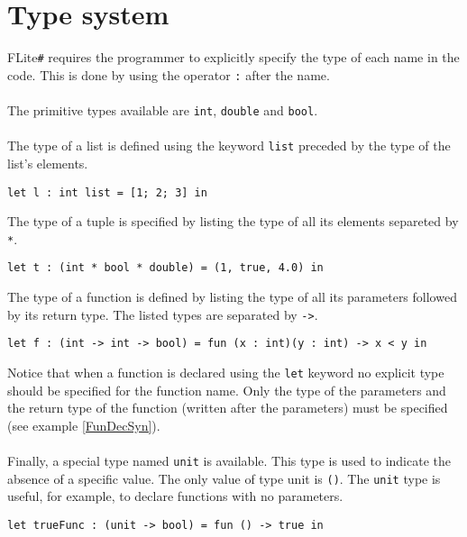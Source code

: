 \documentclass[]{article}
\begin{document}
	\section{Type system}
		FLite\verb|#| requires the programmer to explicitly specify the type of each name in the code. This is done by using the operator \lstinline|:| after the name.\\\\
		The primitive types available are \lstinline|int|, \lstinline|double| and \lstinline|bool|.\\\\
		The type of a list is defined using the keyword \lstinline|list| preceded by the type of the list's elements.
		\begin{lstlisting}[caption={List type}, label=ListType]
let l : int list = [1; 2; 3] in
		\end{lstlisting}
		The type of a tuple is specified by listing the type of all its elements separeted by \lstinline|*|.
		\begin{lstlisting}[caption={Tuple type}, label=TupleType]
let t : (int * bool * double) = (1, true, 4.0) in
		\end{lstlisting}
		The type of a function is defined by listing the type of all its parameters followed by its return type. The listed types are separated by \lstinline|->|. 
		\begin{lstlisting}[caption={Function type}, label=FuncType]
let f : (int -> int -> bool) = fun (x : int)(y : int) -> x < y in
		\end{lstlisting}
		Notice that when a function is declared using the \lstinline|let| keyword no explicit type should be specified for the function name. Only the type of the parameters and the return type of the function (written after the parameters) must be specified (see example \ref{FunDecSyn}).\\\\
		Finally, a special type named \lstinline|unit| is available. This type is used to indicate the absence of a specific value. The only value of type unit is \lstinline|()|. The \lstinline|unit| type is useful, for example, to declare functions with no parameters.
		\begin{lstlisting}[caption={Unit type}, label=UnitType]
let trueFunc : (unit -> bool) = fun () -> true in
		\end{lstlisting}
	
\end{document}
